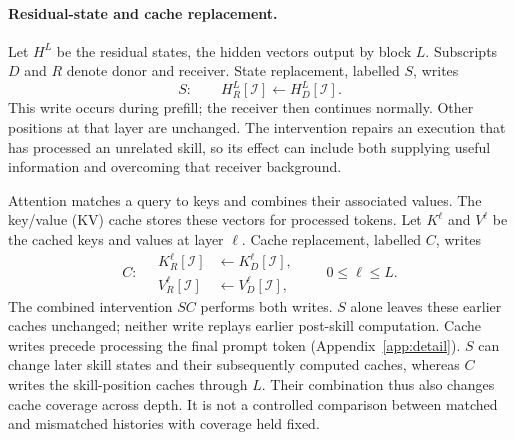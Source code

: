 \paragraph{Residual-state and cache replacement.}
Let $H^L$ be the residual states, the hidden vectors output by block $L$.
Subscripts $D$ and $R$ denote donor and receiver. State replacement,
labelled $S$, writes
\begin{equation}
S:\qquad H_R^L[\mathcal I]\leftarrow H_D^L[\mathcal I].
\label{eq:inject}
\end{equation}
This write occurs during prefill; the receiver then continues normally.
Other positions at that layer are unchanged. The intervention repairs an
execution that has processed an unrelated skill, so its effect can include
both supplying useful information and overcoming that receiver background.

Attention matches a query to keys and combines their associated values.
The key/value (KV) cache stores these vectors for processed tokens.
Let $K^\ell$ and $V^\ell$ be the cached keys and values at layer $\ell$.
Cache replacement, labelled $C$, writes
\begin{equation}
C:\quad
\begin{aligned}
K_R^\ell[\mathcal I]&\leftarrow K_D^\ell[\mathcal I],\\
V_R^\ell[\mathcal I]&\leftarrow V_D^\ell[\mathcal I],
\end{aligned}
\qquad 0\le\ell\le L.
\label{eq:cache}
\end{equation}
The combined intervention $SC$ performs both writes. $S$ alone leaves
these earlier caches unchanged; neither write replays earlier post-skill
computation. Cache writes precede processing the final prompt token
(Appendix~\ref{app:detail}).
$S$ can change later skill states and their subsequently computed caches,
whereas $C$ writes the skill-position caches through $L$. Their combination thus
also changes cache coverage across depth. It is not a controlled comparison
between matched and mismatched histories with coverage held fixed.

